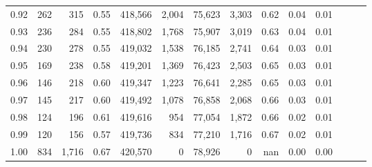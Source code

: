 \begin{tabular}{rrrrrrrrrrrrrr}
0.92 &    262 &    315 &  0.55 &  418,566 &    2,004 &  75,623 &   3,303 &  0.62 &  0.04 &      0.01 \\
0.93 &    236 &    284 &  0.55 &  418,802 &    1,768 &  75,907 &   3,019 &  0.63 &  0.04 &      0.01 \\
0.94 &    230 &    278 &  0.55 &  419,032 &    1,538 &  76,185 &   2,741 &  0.64 &  0.03 &      0.01 \\
0.95 &    169 &    238 &  0.58 &  419,201 &    1,369 &  76,423 &   2,503 &  0.65 &  0.03 &      0.01 \\
0.96 &    146 &    218 &  0.60 &  419,347 &    1,223 &  76,641 &   2,285 &  0.65 &  0.03 &      0.01 \\
0.97 &    145 &    217 &  0.60 &  419,492 &    1,078 &  76,858 &   2,068 &  0.66 &  0.03 &      0.01 \\
0.98 &    124 &    196 &  0.61 &  419,616 &      954 &  77,054 &   1,872 &  0.66 &  0.02 &      0.01 \\
0.99 &    120 &    156 &  0.57 &  419,736 &      834 &  77,210 &   1,716 &  0.67 &  0.02 &      0.01 \\
1.00 &    834 &  1,716 &  0.67 &  420,570 &        0 &  78,926 &       0 &   nan &  0.00 &      0.00 \\
\bottomrule
\end{tabular}
